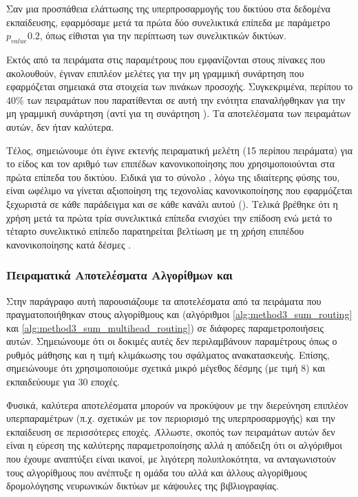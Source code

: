 Σαν μια προσπάθεια ελάττωσης της υπερπροσαρμογής του δικτύου στα δεδομένα εκπαίδευσης, εφαρμόσαμε  μετά τα πρώτα δύο συνελικτικά επίπεδα με παράμετρο $p_{value} 0.2$, όπως είθισται για την περίπτωση των συνελικτικών δικτύων.\par

Εκτός από τα πειράματα στις παραμέτρους που εμφανίζονται στους πίνακες που ακολουθούν, έγιναν επιπλέον μελέτες για την μη γραμμική συνάρτηση που εφαρμόζεται σημειακά στα στοιχεία των πινάκων προσοχής. Συγκεκριμένα, περίπου το 40\% των πειραμάτων που παρατίθενται σε αυτή την ενότητα επαναλήφθηκαν για την μη γραμμική συνάρτηση  (αντί για τη συνάρτηση ). Τα αποτελέσματα των πειραμάτων αυτών, δεν ήταν καλύτερα.\par

Τέλος, σημειώνουμε ότι έγινε εκτενής πειραματική μελέτη (15 περίπου πειράματα) για το είδος και τον αριθμό των επιπέδων κανονικοποίησης που χρησιμοποιούνται στα πρώτα επίπεδα του δικτύου. Ειδικά για το σύνολο , λόγω της ιδιαίτερης φύσης του, είναι ωφέλιμο να γίνεται αξιοποίηση της τεχονολίας κανονικοποίησης που εφαρμόζεται ξεχωριστά σε κάθε παράδειγμα και σε κάθε κανάλι αυτού (). Τελικά βρέθηκε ότι η χρήση  μετά τα πρώτα τρία συνελικτικά επίπεδα ενισχύει την επίδοση ενώ μετά το τέταρτο συνελικτικό επίπεδο παρατηρείται βελτίωση με τη χρήση επιπέδου κανονικοποίησης κατά δέσμες .

\subsubsection{Πειραματικά Αποτελέσματα Αλγορίθμων  και }

Στην παράγραφο αυτή παρουσιάζουμε τα αποτελέσματα από τα πειράματα που πραγματοποιήθηκαν στους αλγορίθμους  και  (αλγόριθμοι \ref{alg:method3_sum_routing} και \ref{alg:method3_sum_multihead_routing}) σε διάφορες παραμετροποιήσεις αυτών. Σημειώνουμε ότι οι δοκιμές αυτές δεν περιλαμβάνουν παραμέτρους όπως ο ρυθμός μάθησης και η τιμή κλιμάκωσης του σφάλματος ανακατασκευής. Επίσης, σημειώνουμε ότι χρησιμοποιούμε σχετικά μικρό μέγεθος δέσμης (με τιμή 8) και εκπαιδεύουμε για 30 εποχές.\par 

Φυσικά, καλύτερα αποτελέσματα μπορούν να προκύψουν με την διερεύνηση επιπλέον υπερπαραμέτρων (π.χ. σχετικών με τον περιορισμό της υπερπροσαρμογής) και την εκπαίδευση σε περισσότερες εποχές. Άλλωστε, σκοπός των πειραμάτων αυτών δεν είναι η εύρεση της καλύτερης παραμετροποίησης αλλά η απόδειξη ότι οι αλγόριθμοι που έχουμε αναπτύξει είναι ικανοί, με λιγότερη πολυπλοκότητα, να ανταγωνιστούν τους αλγορίθμους που ανέπτυξε η ομάδα του  αλλά και άλλους αλγορίθμους δρομολόγησης νευρωνικών δικτύων με κάψουλες της βιβλιογραφίας.\par

